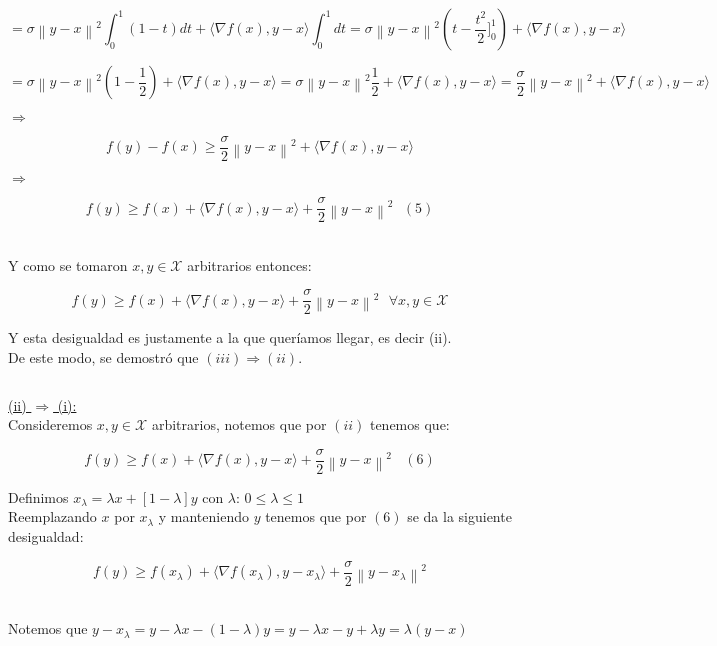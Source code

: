 \documentclass[11pt]{article}
\begin{document}
\[ = \sigma \left\| y-x \right\|^{2} \int_{0}^{1} (1-t) dt  +  \langle  \nabla f(x), y-x \rangle \int_{0}^{1} dt = \sigma \left\| y-x \right\|^{2} \left( t - \frac{t^2}{2} \big]_{0}^{1} \right)  +  \langle  \nabla f(x), y-x \rangle  \]

\[ = \sigma \left\| y-x \right\|^{2} \left( 1 - \frac{1}{2}  \right)  +  \langle  \nabla f(x), y-x \rangle = \sigma \left\| y-x \right\|^{2} \frac{1}{2}  +  \langle  \nabla f(x), y-x \rangle = \frac{\sigma}{2} \left\| y-x \right\|^{2}  +  \langle  \nabla f(x), y-x \rangle \]

$ \Rightarrow $ 

\[ f(y) - f(x) \geq \frac{\sigma}{2} \left\| y-x \right\|^{2}  +  \langle  \nabla f(x), y-x \rangle \]

$ \Rightarrow $ 

\[ f(y) \geq f(x) + \langle  \nabla f(x), y-x \rangle + \frac{\sigma}{2} \left\| y-x \right\|^{2}  \ \ \ (5)  \] \

Y como se tomaron $ x,y \in \mathcal{X} $ arbitrarios entonces:

\[ f(y) \geq f(x) + \langle  \nabla f(x), y-x \rangle + \frac{\sigma}{2} \left\| y-x \right\|^{2} \ \ \ \forall x,y \in \mathcal{X} \]

Y esta desigualdad es justamente a la que queríamos llegar, es decir (ii). \\

De este modo, se demostró que $ \boxed{(iii)  \Rightarrow  (ii)} $. \

\hrulefill

$ \ $ 

\underline{(ii) $ \Rightarrow $ (i):} \\

Consideremos $x,y \in \mathcal{X}$ arbitrarios, notemos que por $ (ii) $ tenemos que:

\[ f(y) \geq f(x) + \langle \nabla f(x), y-x \rangle + \frac{\sigma}{2} \left\| y-x \right\|^{2} \ \ \ \ (6) \]

Definimos $ x_{\lambda} = \lambda x + [1-\lambda] y $ con $ \lambda $: $ 0 \leq \lambda \leq 1 $ \\

Reemplazando $ x $ por $ x_{\lambda} $ y manteniendo $y$ tenemos que por $(6)$ se da la siguiente desigualdad:

\[ f(y) \geq f(x_{\lambda}) + \langle \nabla f(x_{\lambda}), y-x_{\lambda} \rangle + \frac{\sigma}{2} \left\| y-x_{\lambda} \right\|^{2}  \] \

Notemos que $ y - x_{\lambda} = y - \lambda x - (1-\lambda)y = y - \lambda x - y + \lambda y = \lambda(y-x) $ \\
\end{document}
